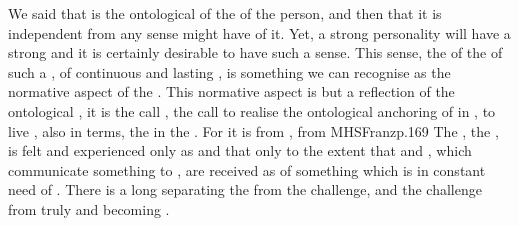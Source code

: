 \pa\label{pa:strengt} We said that  is the ontological 
of the  of the person, and then
that it is independent from any sense  might have of it.  Yet, a
strong personality will have a strong  and it is certainly
desirable to have such a sense. This sense, the  of the
 of such a , of continuous and lasting ,
is something we can recognise as the normative aspect of the . This
normative aspect is but a reflection of the ontological , it is the 
call , the call to  realise the ontological
anchoring of  in , to live , also in
 terms, the   in the .  For it is from
, from \citet{this central nucleus (as far as we know today), [that]
  the whole building up of ego consciousness is directed, the ego apparently
  being a duplicate or structural counterpart of the original
  center.}{MHSFranz}{p.169} 
The , the , is felt and experienced only as
 and that only to the extent that  and
, which communicate something to , are received as
 of something which is in constant need of
.  There is a long  separating the  from the  challenge, and the  challenge
from truly and  becoming .

